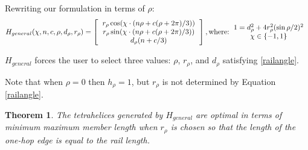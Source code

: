 \documentclass[11pt]{article}
\newtheorem{theorem}{Theorem}
\begin{document}
Rewriting our formulation in terms of $\rho$:
\begin{equation}
  \label{eq:general}
H_{general}(\chi,n,c,\rho,d_{\rho},r_{\rho}) =
\left [
  \begin{tabular}{c}
   $ r_{\rho} \cos(\chi \cdot (n \rho + c(\rho +  2 \pi) /3)) $\\
   $ r_{\rho}  \sin(\chi \cdot (n \rho + c(\rho +  2 \pi) /3)) $\\
   $ d_{\rho} (n + c /3) $
  \end{tabular}
  \right ],
\text{where:}
\begin{tabular}{c}
  $   1 = d_{\rho}^2 + 4 r_{\rho}^2 (\sin{ \rho / 2})^2 $ \\
    $\chi \in \{-1,1\}$ \\  
  \end{tabular}      
\end{equation}


$H_{general}$ forces the user to select three values: $\rho$, $r_{\rho}$, and $d_{\rho}$ satisfying \eqref{railangle}.

Note that when $\rho = 0$ then $h_{\rho} = 1$, but $r_{\rho}$ is not determined by
Equation \ref{railangle}.

\begin{theorem}
  \label{generalformulaoptimal}
  The tetrahelices generated by $H_{general}$ are optimal in terms of minimum maximum member length when $r_{\rho}$ is chosen so that
  the length of the one-hop edge is equal to the rail length.
\end{theorem}
\end{document}
